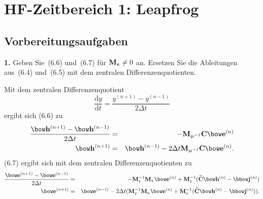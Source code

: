 \documentclass[Protokollheft.tex]{subfiles}
\begin{document}
\chapter{HF-Zeitbereich 1: Leapfrog}
\section{Vorbereitungsaufgaben}



\begin{framed}
	\noindent \textbf{1.} Geben Sie~(6.6) und~(6.7) für $\mathbf{M}_{\upkappa} \neq 0$ an. Ersetzen Sie die Ableitungen aus~(6.4) und~(6.5) mit dem zentralen Differenzenquotienten.\label{exer:updateSchemeNoConductor}
\end{framed}

Mit dem zentralen Differenzenquotient
\begin{equation*}
	\frac{\text{d}y}{\text{d}t}=\frac{y^{(n+1)}-y^{(n-1)}}{2\Delta t}
\end{equation*}
ergibt sich (6.6) zu
\begin{eqnarray*}
	\frac{\hfit^{(n+1)}-\hfit^{(n-1)}}{2\Delta t}&=&-\Mmui\curlfit\efit^{(n)}\\
	\hfit^{(n+1)}&=&\hfit^{(n-1)}-2\Delta t\Mmui\curlfit\efit^{(n)}.
\end{eqnarray*}
(6.7) ergibt sich mit dem zentralen Differenzenquotienten zu
\begin{eqnarray*}
	\frac{\efit^{(n+1)}-\efit^{(n-1)}}{2\Delta t}&=&-\Meps^{-1}\Mkap\efit^{(n)}+\Meps^{-1}(\curldfit\hfit^{(n)}-\jfit^{(n)})\\
	\efit^{(n+1)}&=&\efit^{(n-1)}-2\Delta t(\Meps^{-1}\Mkap\efit^{(n)}+\Meps^{-1}(\curldfit\hfit^{(n)}-\jfit^{(n)})).
\end{eqnarray*}
\end{document}
